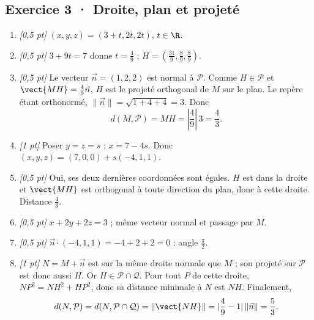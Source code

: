 \subsection*{Exercice 3 · Droite, plan et projeté}\begin{enumerate}

\item \textit{[0,5 pt]} $(x,y,z)=(3+t,2t,2t)$, $t\in\R$.

\item \textit{[0,5 pt]} $3+9t=7$ donne $t=\frac{4}{9}$ ; $H=(\frac{31}{9},\frac{8}{9},\frac{8}{9})$.

\item \textit{[0,5 pt]} Le vecteur $\vec n=(1,2,2)$ est normal à $\mathcal P$. Comme $H\in\mathcal P$ et $\vect{MH}=\frac{4}{9}\vec n$, $H$ est le projeté orthogonal de $M$ sur le plan. Le repère étant orthonormé, $\|\vec n\|=\sqrt{1+4+4}=3$. Donc
\[d(M,\mathcal P)=MH=|\frac{4}{9}|\,3=\frac{4}{3}.\]

\item \textit{[1 pt]} Poser $y=z=s$ ; $x=7-4s$. Donc $(x,y,z)=(7,0,0)+s(-4,1,1)$.

\item \textit{[0,5 pt]} Oui, ses deux dernières coordonnées sont égales. $H$ est dans la droite et $\vect{MH}$ est orthogonal à toute direction du plan, donc à cette droite. Distance $\frac{4}{3}$.

\item \textit{[0,5 pt]} $x+2y+2z=3$ ; même vecteur normal et passage par $M$.

\item \textit{[0,5 pt]} $\vec n\cdot(-4,1,1)=-4+2+2=0$ : angle $\frac{\pi}{2}$.

\item \textit{[1 pt]} $N=M+\vec n$ est sur la même droite normale que $M$ ; son projeté sur $\mathcal P$ est donc aussi $H$. Or $H\in\mathcal P\cap\mathcal Q$. Pour tout $P$ de cette droite, $NP^2=NH^2+HP^2$, donc sa distance minimale à $N$ est $NH$. Finalement,
\[d(N,\mathcal P)=d(N,\mathcal P\cap\mathcal Q)=\|\vect{NH}\|=|\frac{4}{9}-1|\,\|\vec n\|=\frac{5}{3}.\]

\end{enumerate}


